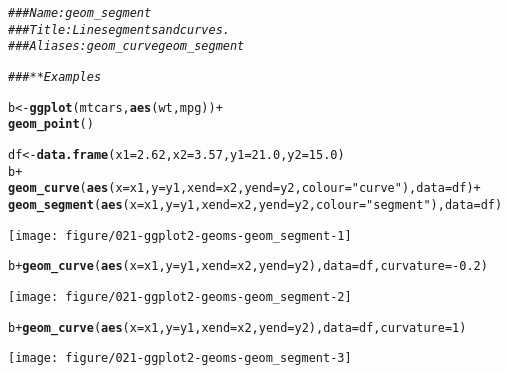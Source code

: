\documentclass[a4paper,titlepage]{tufte-handout}\usepackage[]{graphicx}\usepackage[]{color}
\makeatletter
\def\maxwidth{ %
  \ifdim\Gin@nat@width>\linewidth
    \linewidth
  \else
    \Gin@nat@width
  \fi
}
\newcommand{\hlnum}[1]{\textcolor[rgb]{0.686,0.059,0.569}{#1}}%
\newcommand{\hlstr}[1]{\textcolor[rgb]{0.192,0.494,0.8}{#1}}%
\newcommand{\hlcom}[1]{\textcolor[rgb]{0.678,0.584,0.686}{\textit{#1}}}%
\newcommand{\hlopt}[1]{\textcolor[rgb]{0,0,0}{#1}}%
\newcommand{\hlstd}[1]{\textcolor[rgb]{0.345,0.345,0.345}{#1}}%
\newcommand{\hlkwb}[1]{\textcolor[rgb]{0.69,0.353,0.396}{#1}}%
\newcommand{\hlkwc}[1]{\textcolor[rgb]{0.333,0.667,0.333}{#1}}%
\newcommand{\hlkwd}[1]{\textcolor[rgb]{0.737,0.353,0.396}{\textbf{#1}}}%
\newenvironment{kframe}{%
 \def\at@end@of@kframe{}%
 \ifinner\ifhmode%
  \def\at@end@of@kframe{\end{minipage}}%
  \begin{minipage}{\columnwidth}%
 \fi\fi%
 \def\FrameCommand##1{\hskip\@totalleftmargin \hskip-\fboxsep
 \colorbox{shadecolor}{##1}\hskip-\fboxsep
     \hskip-\linewidth \hskip-\@totalleftmargin \hskip\columnwidth}%
 \MakeFramed {\advance\hsize-\width
   \@totalleftmargin\z@ \linewidth\hsize
   \@setminipage}}%
 {\par\unskip\endMakeFramed%
 \at@end@of@kframe}
\newenvironment{knitrout}{}{} %
\makeatother
\begin{document}
\begin{knitrout}
\color{fgcolor}\begin{kframe}
\begin{alltt}
\hlcom{### Name: geom_segment}
\hlcom{### Title: Line segments and curves.}
\hlcom{### Aliases: geom_curve geom_segment}

\hlcom{### ** Examples}

\hlstd{b} \hlkwb{<-} \hlkwd{ggplot}\hlstd{(mtcars,} \hlkwd{aes}\hlstd{(wt, mpg))} \hlopt{+}
  \hlkwd{geom_point}\hlstd{()}

\hlstd{df} \hlkwb{<-} \hlkwd{data.frame}\hlstd{(}\hlkwc{x1} \hlstd{=} \hlnum{2.62}\hlstd{,} \hlkwc{x2} \hlstd{=} \hlnum{3.57}\hlstd{,} \hlkwc{y1} \hlstd{=} \hlnum{21.0}\hlstd{,} \hlkwc{y2} \hlstd{=} \hlnum{15.0}\hlstd{)}
\hlstd{b} \hlopt{+}
 \hlkwd{geom_curve}\hlstd{(}\hlkwd{aes}\hlstd{(}\hlkwc{x} \hlstd{= x1,} \hlkwc{y} \hlstd{= y1,} \hlkwc{xend} \hlstd{= x2,} \hlkwc{yend} \hlstd{= y2,} \hlkwc{colour} \hlstd{=} \hlstr{"curve"}\hlstd{),} \hlkwc{data} \hlstd{= df)} \hlopt{+}
 \hlkwd{geom_segment}\hlstd{(}\hlkwd{aes}\hlstd{(}\hlkwc{x} \hlstd{= x1,} \hlkwc{y} \hlstd{= y1,} \hlkwc{xend} \hlstd{= x2,} \hlkwc{yend} \hlstd{= y2,} \hlkwc{colour} \hlstd{=} \hlstr{"segment"}\hlstd{),} \hlkwc{data} \hlstd{= df)}
\end{alltt}
\end{kframe}
\texttt{[image: figure/021-ggplot2-geoms-geom\_segment-1]} 
\begin{kframe}\begin{alltt}
\hlstd{b} \hlopt{+} \hlkwd{geom_curve}\hlstd{(}\hlkwd{aes}\hlstd{(}\hlkwc{x} \hlstd{= x1,} \hlkwc{y} \hlstd{= y1,} \hlkwc{xend} \hlstd{= x2,} \hlkwc{yend} \hlstd{= y2),} \hlkwc{data} \hlstd{= df,} \hlkwc{curvature} \hlstd{=} \hlopt{-}\hlnum{0.2}\hlstd{)}
\end{alltt}
\end{kframe}
\texttt{[image: figure/021-ggplot2-geoms-geom\_segment-2]} 
\begin{kframe}\begin{alltt}
\hlstd{b} \hlopt{+} \hlkwd{geom_curve}\hlstd{(}\hlkwd{aes}\hlstd{(}\hlkwc{x} \hlstd{= x1,} \hlkwc{y} \hlstd{= y1,} \hlkwc{xend} \hlstd{= x2,} \hlkwc{yend} \hlstd{= y2),} \hlkwc{data} \hlstd{= df,} \hlkwc{curvature} \hlstd{=} \hlnum{1}\hlstd{)}
\end{alltt}
\end{kframe}
\texttt{[image: figure/021-ggplot2-geoms-geom\_segment-3]} 
\begin{kframe}\begin{alltt}

\end{alltt}
\end{kframe}
\end{knitrout}
\end{document}
